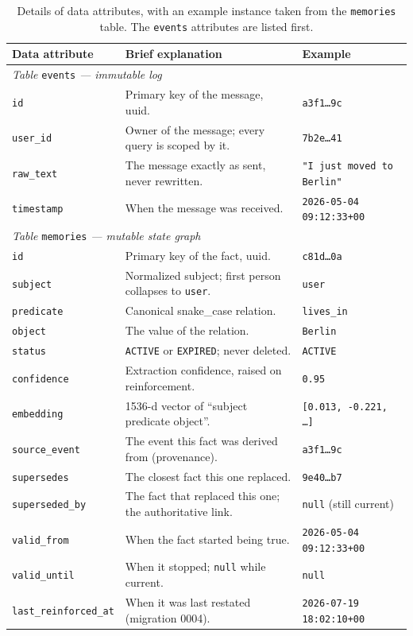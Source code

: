 \documentclass[11pt,a4paper]{article}
\begin{document}
\begin{table}[htbp]
\centering
\caption{Details of data attributes, with an example instance taken from the
\texttt{memories} table. The \texttt{events} attributes are listed first.}
\label{tab:attrs}
\small
\begin{tabularx}{\textwidth}{p{3.1cm} X p{3.4cm}}
\toprule
\textbf{Data attribute} & \textbf{Brief explanation} & \textbf{Example}\\
\midrule
\multicolumn{3}{l}{\textit{Table }\texttt{events}\textit{ --- immutable log}}\\
\midrule
\texttt{id} & Primary key of the message, uuid. & \texttt{a3f1\dots{}9c} \\
\texttt{user\_id} & Owner of the message; every query is scoped by it. & \texttt{7b2e\dots{}41}\\
\texttt{raw\_text} & The message exactly as sent, never rewritten. & \texttt{"I just moved to Berlin"}\\
\texttt{timestamp} & When the message was received. & \texttt{2026-05-04 09:12:33+00}\\
\midrule
\multicolumn{3}{l}{\textit{Table }\texttt{memories}\textit{ --- mutable state graph}}\\
\midrule
\texttt{id} & Primary key of the fact, uuid. & \texttt{c81d\dots{}0a}\\
\texttt{subject} & Normalized subject; first person collapses to \texttt{user}. & \texttt{user}\\
\texttt{predicate} & Canonical snake\_case relation. & \texttt{lives\_in}\\
\texttt{object} & The value of the relation. & \texttt{Berlin}\\
\texttt{status} & \texttt{ACTIVE} or \texttt{EXPIRED}; never deleted. & \texttt{ACTIVE}\\
\texttt{confidence} & Extraction confidence, raised on reinforcement. & \texttt{0.95}\\
\texttt{embedding} & 1536-d vector of ``subject predicate object''. & \texttt{[0.013, -0.221, \dots]}\\
\texttt{source\_event} & The event this fact was derived from (provenance). & \texttt{a3f1\dots{}9c}\\
\texttt{supersedes} & The closest fact this one replaced. & \texttt{9e40\dots{}b7}\\
\texttt{superseded\_by} & The fact that replaced this one; the authoritative link. & \texttt{null} (still current)\\
\texttt{valid\_from} & When the fact started being true. & \texttt{2026-05-04 09:12:33+00}\\
\texttt{valid\_until} & When it stopped; \texttt{null} while current. & \texttt{null}\\
\texttt{last\_reinforced\_at} & When it was last restated (migration 0004). & \texttt{2026-07-19 18:02:10+00}\\
\bottomrule
\end{tabularx}
\end{table}
\end{document}
